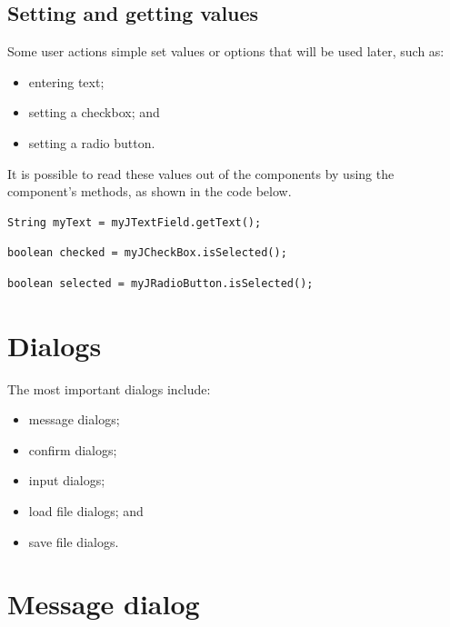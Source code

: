 \documentclass[a4paper]{systems-software}
\begin{document}
\subsection*{Setting and getting values}

Some user actions simple set values or options that will be used later, such as:
\begin{itemize}
	\item entering text;
	\item setting a checkbox; and
	\item setting a radio button.
\end{itemize}

It is possible to read these values out of the components by using the component's methods, as shown in the code below.

\begin{lstlisting}[title={Reading value from a text field.}]
String myText = myJTextField.getText();
\end{lstlisting}

\begin{lstlisting}[title={Reading value from a checkbox.}]
boolean checked = myJCheckBox.isSelected();
\end{lstlisting}

\begin{lstlisting}[title={Reading value from a radio button.}]
boolean selected = myJRadioButton.isSelected();
\end{lstlisting}


\section{Dialogs}

The most important dialogs include:
\begin{itemize}
	\item message dialogs;
	\item confirm dialogs;
	\item input dialogs;
	\item load file dialogs; and
	\item save file dialogs.
\end{itemize}


\section*{Message dialog}
\end{document}

